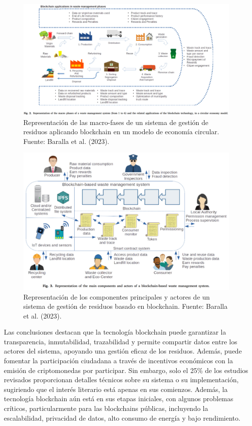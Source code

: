 \documentclass[main.tex]{subfiles}
\begin{document}
\begin{figure}[h]
	\centering
	\includegraphics[width=1\textwidth]{./assets/baralla-model-1.png}
	\caption{Representación de las macro-fases de un sistema de gestión de residuos aplicando blockchain en un modelo de economía circular. Fuente: Baralla et al. (2023).}
	\label{fig:baralla-1}
\end{figure}

\begin{figure}[h]
	\centering
	\includegraphics[width=1\textwidth]{./assets/baralla-model-2.png}
	\caption{Representación de los componentes principales y actores de un sistema de gestión de residuos basado en blockchain. Fuente: Baralla et al. (2023).}
	\label{fig:baralla-2}
\end{figure}

Las conclusiones destacan que la tecnología blockchain puede garantizar la transparencia, inmutabilidad, trazabilidad y permite compartir datos entre los actores del sistema, apoyando una gestión eficaz de los residuos. Además, puede fomentar la participación ciudadana a través de incentivos económicos con la emisión de criptomonedas por participar. Sin embargo, solo el 25\% de los estudios revisados proporcionan detalles técnicos sobre su sistema o su implementación, sugiriendo que el interés literario está apenas en sus comienzos. Además, la tecnología blockchain aún está en sus etapas iniciales, con algunos problemas críticos, particularmente para las blockchains públicas, incluyendo la escalabilidad, privacidad de datos, alto consumo de energía y bajo rendimiento.
\end{document}
